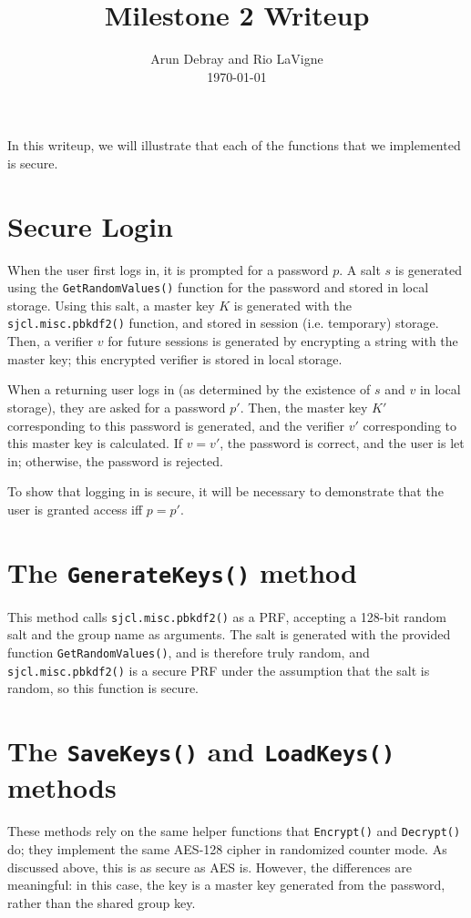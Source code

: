 \documentclass{amsart}
\begin{document}
\title{Milestone 2 Writeup}
\author{Arun Debray and Rio LaVigne\\\today}
\maketitle
In this writeup, we will illustrate that each of the functions that we implemented is secure.
\section{Secure Login}%
When the user first logs in, it is prompted for a password $p$. A salt $s$ is generated using the \verb+GetRandomValues()+ function for the password and stored in local storage. Using this salt, a master key $K$ is generated with the \verb+sjcl.misc.pbkdf2()+ function, and stored in session (i.e. temporary) storage. Then, a verifier $v$ for future sessions is generated by encrypting a string with the master key; this encrypted verifier is stored in local storage.

When a returning user logs in (as determined by the existence of $s$ and $v$ in local storage), they are asked for a password $p'$. Then, the master key $K'$ corresponding to this password is generated, and the verifier $v'$ corresponding to this master key is calculated. If $v = v'$, the password is correct, and the user is let in; otherwise, the password is rejected.

To show that logging in is secure, it will be necessary to demonstrate that the user is granted access iff $p  =p'$. 

\section{The \texttt{GenerateKeys()} method}%
This method calls \verb+sjcl.misc.pbkdf2()+ as a PRF, accepting a 128-bit random salt and the group name as arguments. The salt is generated with the provided function \verb+GetRandomValues()+, and is therefore truly random, and \verb+sjcl.misc.pbkdf2()+ is a secure PRF under the assumption that the salt is random, so this function is secure.

\section{The \texttt{SaveKeys()} and \texttt{LoadKeys()} methods}%
These methods rely on the same helper functions that \verb+Encrypt()+ and \verb+Decrypt()+ do; they implement the same AES-128 cipher in randomized counter mode. As discussed above, this is as secure as AES is. However, the differences are meaningful: in this case, the key is a master key generated from the password, rather than the shared group key.
\end{document}
